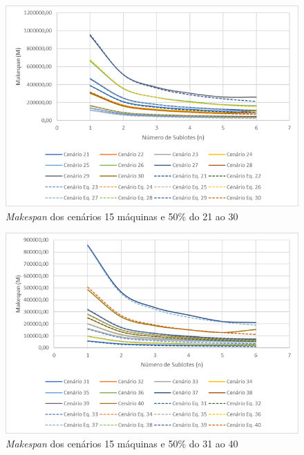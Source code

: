 \begin{figure}[H]
    \centering
     \includegraphics[width=13cm]{Apendices/Figuras/15m50_21-30.png}
     \caption{\textit{Makespan} dos cenários 15 máquinas e 50\% do 21 ao 30}
    \label{fig:15m50_21-30}
\end{figure}

\begin{figure}[H]
    \centering
     \includegraphics[width=13cm]{Apendices/Figuras/15m50_31-40.png}
     \caption{\textit{Makespan} dos cenários 15 máquinas e 50\% do 31 ao 40}
    \label{fig:15m50_31-40}
\end{figure}

